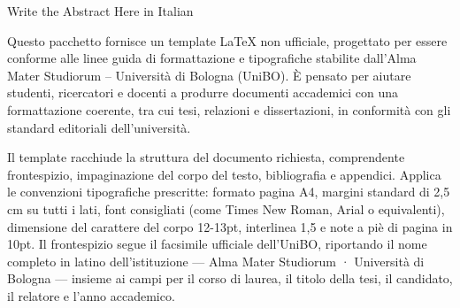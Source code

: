 Write the Abstract Here in Italian

Questo pacchetto fornisce un template LaTeX non ufficiale, progettato per essere conforme alle linee guida di formattazione e tipografiche stabilite dall'Alma Mater Studiorum – Università di Bologna (UniBO). È pensato per aiutare studenti, ricercatori e docenti a produrre documenti accademici con una formattazione coerente, tra cui tesi, relazioni e dissertazioni, in conformità con gli standard editoriali dell'università.

Il template racchiude la struttura del documento richiesta, comprendente frontespizio, impaginazione del corpo del testo, bibliografia e appendici. Applica le convenzioni tipografiche prescritte: formato pagina A4, margini standard di 2,5 cm su tutti i lati, font consigliati (come Times New Roman, Arial o equivalenti), dimensione del carattere del corpo 12-13pt, interlinea 1,5 e note a piè di pagina in 10pt. Il frontespizio segue il facsimile ufficiale dell'UniBO, riportando il nome completo in latino dell'istituzione — Alma Mater Studiorum · Università di Bologna — insieme ai campi per il corso di laurea, il titolo della tesi, il candidato, il relatore e l'anno accademico.